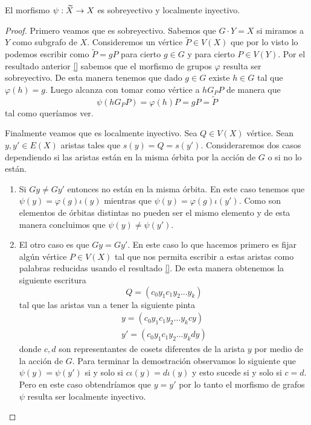 \documentclass[tesis.tex]{subfiles}
\begin{document}
\begin{prop}
	El morfismo $\psi: \widetilde X \to X$ es sobreyectivo y localmente inyectivo.
\end{prop}
\begin{proof}
	Primero veamos que es sobreyectivo.
	Sabemos que $G \cdot Y = X$ si miramos a $Y$ como subgrafo de $X$.
	Consideremos un vértice $\widetilde P \in V(X)$ que por lo visto lo podemos escribir como $\widetilde P = g P$ para cierto $g \in G$ y para cierto $P \in V(Y)$.
	Por el resultado anterior \ref{} sabemos que el morfismo de grupos $\varphi$ resulta ser sobreyectivo.
	De esta manera tenemos que dado $g \in G$ existe $h \in G$ tal que $\varphi(h) = g$. 
	Luego alcanza con tomar como vértice a $h G_P P $ de manera que 
	\[
	\psi(h G_P P ) = \varphi(h) P = g P = \widetilde P
	\]
	tal como queríamos ver.
	
	
	Finalmente veamos que es localmente inyectivo.
	Sea $Q \in V(X)$ vértice. 
	Sean $y,y' \in E(X)$ aristas tales que $s(y) = Q = s(y')$.
	Consideraremos dos casos dependiendo si las aristas están en la misma órbita por la acción de $G$ o si no lo están.
	
	\begin{enumerate}
		\item Si $Gy \neq Gy'$ entonces no están en la misma órbita.
		En este caso tenemos que $\psi(y) = \varphi(g) \iota (y)$ mientras que $\psi(y) = \varphi(g) \iota (y')$.
		Como son elementos de órbitas distintas no pueden ser el mismo elemento y de esta manera concluimos que $\psi(y) \neq \psi(y').$
		\item El otro caso es que $Gy = Gy'$. 
		En este caso lo que hacemos primero es fijar algún vértice $P \in V(X)$ tal que nos permita escribir a estas aristas como palabras reducidas usando el resultado \ref{}.
		De esta manera obtenemos la siguiente escritura 
		\[
		Q = (c_0y_1c_1y_2 \dots y_k)
		\]
		tal que las aristas van a tener la siguiente pinta 
		\begin{align*}
			y = (c_0y_1c_1y_2 \dots y_k c y) \\
			y' = (c_0y_1c_1y_2 \dots y_k d y)
		\end{align*}
		donde $c,d$ son representantes de cosets diferentes de la arista $y$ por medio de la acción de $G$.
		Para terminar la demostración observamos lo siguiente que $\psi(y) = \psi(y')$ si y solo si $c \iota(y) = d \iota(y)$ y esto sucede si y solo si $c = d$. 
		Pero en este caso obtendríamos que $y = y'$ por lo tanto el morfismo de grafos $\psi$ resulta ser localmente inyectivo.
	\end{enumerate}
\end{proof}
\end{document}

